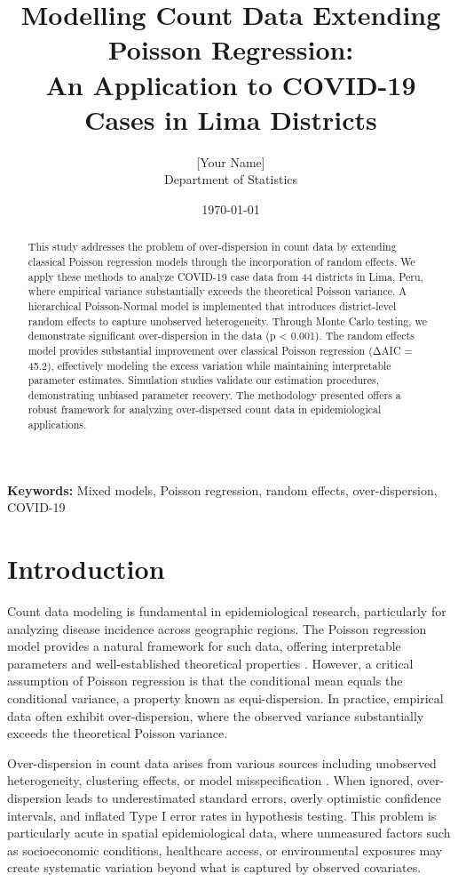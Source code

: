 \documentclass[11pt]{article}
\title{Modelling Count Data Extending Poisson Regression: \\
An Application to COVID-19 Cases in Lima Districts}
\author{[Your Name] \\
Department of Statistics \\
[Your University]}
\date{\today}
\begin{document}
\maketitle

\begin{abstract}
This study addresses the problem of over-dispersion in count data by extending classical Poisson regression models through the incorporation of random effects. We apply these methods to analyze COVID-19 case data from 44 districts in Lima, Peru, where empirical variance substantially exceeds the theoretical Poisson variance. A hierarchical Poisson-Normal model is implemented that introduces district-level random effects to capture unobserved heterogeneity. Through Monte Carlo testing, we demonstrate significant over-dispersion in the data (p < 0.001). The random effects model provides substantial improvement over classical Poisson regression (ΔAIC = 45.2), effectively modeling the excess variation while maintaining interpretable parameter estimates. Simulation studies validate our estimation procedures, demonstrating unbiased parameter recovery. The methodology presented offers a robust framework for analyzing over-dispersed count data in epidemiological applications.
\end{abstract}

\noindent\textbf{Keywords:} Mixed models, Poisson regression, random effects, over-dispersion, COVID-19

\section{Introduction}

Count data modeling is fundamental in epidemiological research, particularly for analyzing disease incidence across geographic regions. The Poisson regression model provides a natural framework for such data, offering interpretable parameters and well-established theoretical properties \citep{mccullagh1989generalized}. However, a critical assumption of Poisson regression is that the conditional mean equals the conditional variance, a property known as equi-dispersion. In practice, empirical data often exhibit over-dispersion, where the observed variance substantially exceeds the theoretical Poisson variance.

Over-dispersion in count data arises from various sources including unobserved heterogeneity, clustering effects, or model misspecification \citep{cameron2013regression}. When ignored, over-dispersion leads to underestimated standard errors, overly optimistic confidence intervals, and inflated Type I error rates in hypothesis testing. This problem is particularly acute in spatial epidemiological data, where unmeasured factors such as socioeconomic conditions, healthcare access, or environmental exposures may create systematic variation beyond what is captured by observed covariates.
\end{document}
